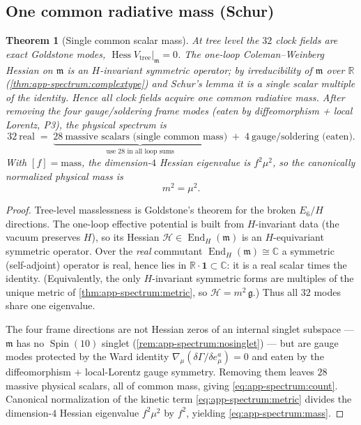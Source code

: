 \documentclass[11pt]{article}
\theoremstyle{plain}
\newtheorem{theorem}{Theorem}[section]
\theoremstyle{definition}
\theoremstyle{remark}
\newcommand{\Spin}{\operatorname{Spin}}
\newcommand{\End}{\operatorname{End}}
\newcommand{\Hess}{\operatorname{Hess}}
\begin{document}
\subsection{One common radiative mass (Schur)}
\label{sec:app-spectrum:mass}

\begin{theorem}[Single common scalar mass]
\label{thm:app-spectrum:schurmass}
At tree level the $32$ clock fields are exact Goldstone modes,
$\Hess V_{\mathrm{tree}}|_{\mathfrak m}=0$. The one-loop Coleman--Weinberg
Hessian on $\mathfrak m$ is an $H$-invariant symmetric operator; by
irreducibility of $\mathfrak m$ over $\mathbb R$
(\autoref{thm:app-spectrum:complextype}) and Schur's lemma it is a
\emph{single scalar multiple of the identity}. Hence all clock fields
acquire one common radiative mass. After removing the four gauge/soldering
frame modes (eaten by diffeomorphism + local Lorentz, P3), the physical
spectrum is
\begin{equation}
  32\ \text{real}\;=\;\underbrace{28\ \text{massive scalars (single common mass)}}_{\text{use }28\text{ in all loop sums}}
  \;+\;4\ \text{gauge/soldering (eaten)} .
  \label{eq:app-spectrum:count}
\end{equation}
With $[f]=\mathrm{mass}$, the dimension-$4$ Hessian eigenvalue is
$f^2\mu^2$, so the canonically normalized physical mass is
\begin{equation}
  m^2=\mu^2 .
  \label{eq:app-spectrum:mass}
\end{equation}
\end{theorem}

\begin{proof}
Tree-level masslessness is Goldstone's theorem for the broken $E_6/H$
directions. The one-loop effective potential is built from $H$-invariant
data (the vacuum preserves $H$), so its Hessian
$\mathcal H\in\End_H(\mathfrak m)$ is an $H$-equivariant symmetric
operator. Over the \emph{real} commutant
$\End_H(\mathfrak m)\cong\mathbb C$ a symmetric (self-adjoint) operator is
real, hence lies in $\mathbb R\cdot\mathbf 1\subset\mathbb C$: it is a
real scalar times the identity. (Equivalently, the only $H$-invariant
symmetric forms are multiples of the unique metric of
\autoref{thm:app-spectrum:metric}, so $\mathcal H=m^2\,\mathfrak g$.) Thus
all $32$ modes share one eigenvalue.

The four frame directions are not Hessian zeros of an internal singlet
subspace --- $\mathfrak m$ has no $\Spin(10)$ singlet
(\autoref{rem:app-spectrum:nosinglet}) --- but are gauge modes protected
by the Ward identity $\nabla_\mu(\delta\Gamma/\delta e^a_\mu)=0$ and eaten
by the diffeomorphism $+$ local-Lorentz gauge symmetry. Removing them
leaves $28$ massive physical scalars, all of common mass, giving
\eqref{eq:app-spectrum:count}. Canonical normalization of the
kinetic term \eqref{eq:app-spectrum:metric} divides the dimension-$4$
Hessian eigenvalue $f^2\mu^2$ by $f^2$, yielding
\eqref{eq:app-spectrum:mass}.
\end{proof}
\end{document}
